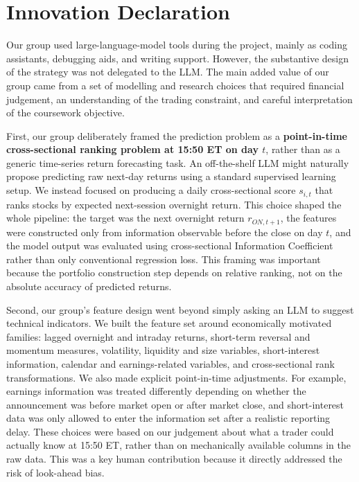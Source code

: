 \documentclass[12pt]{article}
\begin{document}
\newpage
 


\clearpage


\clearpage


\section*{Innovation Declaration}

Our group used large-language-model tools during the project, mainly as coding assistants, debugging aids, and writing support. However, the substantive design of the strategy was not delegated to the LLM. The main added value of our group came from a set of modelling and research choices that required financial judgement, an understanding of the trading constraint, and careful interpretation of the coursework objective.

First, our group deliberately framed the prediction problem as a \textbf{point-in-time cross-sectional ranking problem at 15:50 ET on day $t$}, rather than as a generic time-series return forecasting task. An off-the-shelf LLM might naturally propose predicting raw next-day returns using a standard supervised learning setup. We instead focused on producing a daily cross-sectional score $s_{i,t}$ that ranks stocks by expected next-session overnight return. This choice shaped the whole pipeline: the target was the next overnight return $r_{ON,t+1}$, the features were constructed only from information observable before the close on day $t$, and the model output was evaluated using cross-sectional Information Coefficient rather than only conventional regression loss. This framing was important because the portfolio construction step depends on relative ranking, not on the absolute accuracy of predicted returns.

Second, our group’s feature design went beyond simply asking an LLM to suggest technical indicators. We built the feature set around economically motivated families: lagged overnight and intraday returns, short-term reversal and momentum measures, volatility, liquidity and size variables, short-interest information, calendar and earnings-related variables, and cross-sectional rank transformations. We also made explicit point-in-time adjustments. For example, earnings information was treated differently depending on whether the announcement was before market open or after market close, and short-interest data was only allowed to enter the information set after a realistic reporting delay. These choices were based on our judgement about what a trader could actually know at 15:50 ET, rather than on mechanically available columns in the raw data. This was a key human contribution because it directly addressed the risk of look-ahead bias.
\end{document}
